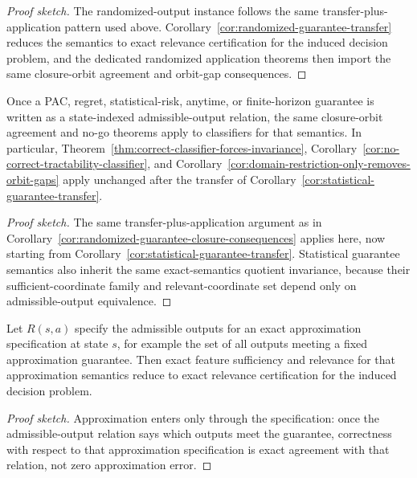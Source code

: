 \begin{proof}[Proof sketch]
The randomized-output instance follows the same transfer-plus-application pattern used above. Corollary~\ref{cor:randomized-guarantee-transfer} reduces the semantics to exact relevance certification for the induced decision problem, and the dedicated randomized application theorems then import the same closure-orbit agreement and orbit-gap consequences.
\end{proof}

\begin{corollary}\label{cor:statistical-guarantee-closure-consequences}
Once a PAC, regret, statistical-risk, anytime, or finite-horizon guarantee is written as a state-indexed admissible-output relation, the same closure-orbit agreement and no-go theorems apply to classifiers for that semantics. In particular, Theorem~\ref{thm:correct-classifier-forces-invariance}, Corollary~\ref{cor:no-correct-tractability-classifier}, and Corollary~\ref{cor:domain-restriction-only-removes-orbit-gaps} apply unchanged after the transfer of Corollary~\ref{cor:statistical-guarantee-transfer}.
\end{corollary}

\begin{proof}[Proof sketch]
The same transfer-plus-application argument as in Corollary~\ref{cor:randomized-guarantee-closure-consequences} applies here, now starting from Corollary~\ref{cor:statistical-guarantee-transfer}. Statistical guarantee semantics also inherit the same exact-semantics quotient invariance, because their sufficient-coordinate family and relevant-coordinate set depend only on admissible-output equivalence.
\end{proof}

\begin{corollary}\label{cor:approximation-transfer}
Let $R(s,a)$ specify the admissible outputs for an exact approximation specification at state $s$, for example the set of all outputs meeting a fixed approximation guarantee. Then exact feature sufficiency and relevance for that approximation semantics reduce to exact relevance certification for the induced decision problem.
\end{corollary}

\begin{proof}[Proof sketch]
Approximation enters only through the specification: once the admissible-output relation says which outputs meet the guarantee, correctness with respect to that approximation specification is exact agreement with that relation, not zero approximation error.
\end{proof}

